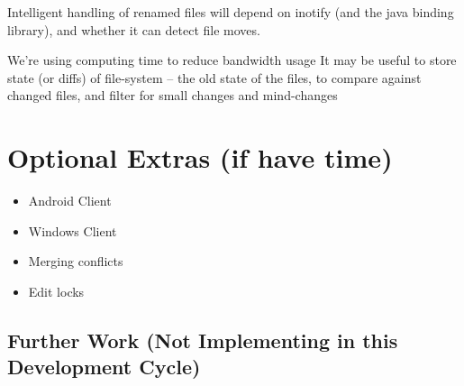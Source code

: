 \documentclass[12pt,a4paper,]{adreport}
\begin{document}
Intelligent handling of renamed files will depend on inotify (and the
java binding library), and whether it can detect file moves.

We're using computing time to reduce bandwidth usage It may be useful to
store state (or diffs) of file-system -- the old state of the files, to
compare against changed files, and filter for small changes and
mind-changes

\chapter{Optional Extras (if have
time)}\label{optional-extras-if-have-time}

\begin{itemize}
\itemsep1pt\parskip0pt
\item
  Android Client
\item
  Windows Client
\item
  Merging conflicts
\item
  Edit locks
\end{itemize}

\section{Further Work (Not Implementing in this Development
Cycle)}\label{further-work-not-implementing-in-this-development-cycle}
\end{document}
